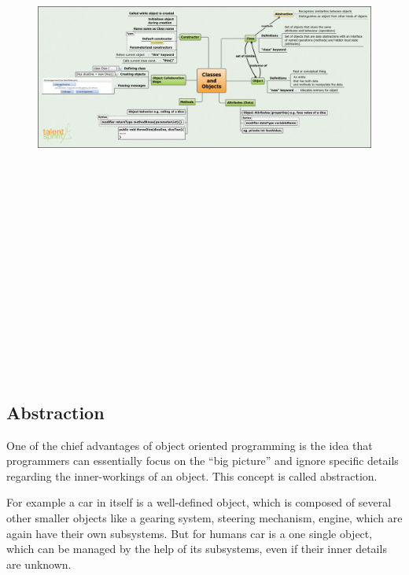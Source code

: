 \documentclass[11pt,a4paper]{article}
\begin{document}
\begin{figure}[H]
 \begin{center}
   \includegraphics[angle=90,height=20cm, width=13cm]{ClassesAndObjects.png}
   
 \end{center}
 \end{figure}
\subsection*{Abstraction}
One of the chief advantages of object oriented programming is the idea that programmers can essentially focus on the ``big picture'' and ignore specific details regarding the inner-workings of an object. This concept is called abstraction.


For example a car in itself is a well-defined object, which is composed of several other smaller objects like a gearing system, steering mechanism, engine, which are again have their own subsystems. But for humans car is a one single object, which can be managed by the help of its subsystems, even if their inner details are unknown.
\end{document}
